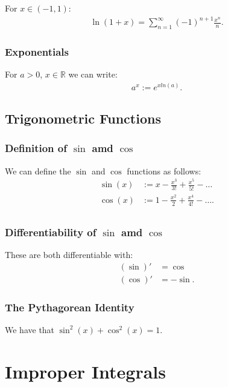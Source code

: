 \documentclass[a4paper, 12pt, twoside]{article}
\begin{document}
For $x \in (-1, 1)$:
\begin{align*}
      \ln(1 + x) = \sum_{n = 1}^\infty(-1)^{n + 1} \frac{x^n}{n}.
\end{align*}

\subsubsection{Exponentials}

For $a > 0$, $x \in \mathbb{R}$ we can write:
\begin{align*}
      a^x := e^{xln(a)}.
\end{align*}

\subsection{Trigonometric Functions}

\subsubsection{Definition of $\sin$ amd $\cos$}

We can define the $\sin$ and $\cos$ functions as follows:
\begin{align*}
      \sin(x) &:= x - \frac{x^3}{3!} + \frac{x^5}{5!} - \ldots \\
      \cos(x) &:= 1 - \frac{x^2}{2} + \frac{x^4}{4!} - \ldots. \\      
\end{align*}

\subsubsection{Differentiability of $\sin$ amd $\cos$}

These are both differentiable with:
\begin{align*}
      (\sin)' &= \cos \\
      (\cos)' &= -\sin.
\end{align*}

\subsubsection{The Pythagorean Identity}

We have that $\sin^2(x) + \cos^2(x) = 1$.

\section{Improper Integrals}
\end{document}
